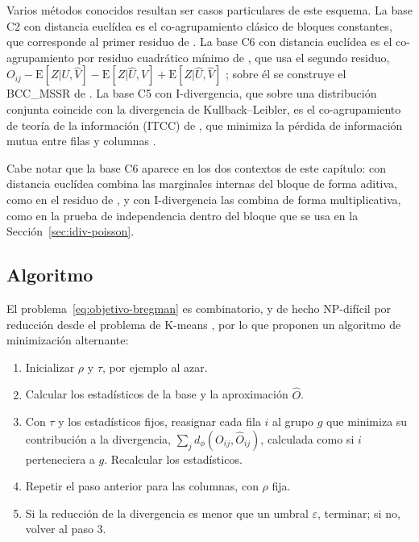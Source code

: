 Varios métodos conocidos resultan ser casos particulares de este esquema. La base
C2 con distancia euclídea es el co-agrupamiento clásico de bloques constantes, que
corresponde al primer residuo de \cite{Cho2004}. La base C6 con distancia euclídea
es el co-agrupamiento por residuo cuadrático mínimo de \cite{Cho2004}, que usa el
segundo residuo, $O_{ij} - \mathrm{E}[Z|U,\hat{V}] - \mathrm{E}[Z|\hat{U},V] +
\mathrm{E}[Z|\hat{U},\hat{V}]$ \cite[Ejemplo~2.F]{Banerjee2007}; sobre él se
construye el BCC\_MSSR de \cite{Wu2022}. La base C5 con I-divergencia, que sobre
una distribución conjunta coincide con la divergencia de Kullback--Leibler, es el
co-agrupamiento de teoría de la información (ITCC) de \cite{Dhillon2003}, que
minimiza la pérdida de información mutua entre filas y columnas
\cite[Ejemplo~1.F]{Banerjee2007}.

Cabe notar que la base C6 aparece en los dos contextos de este capítulo: con
distancia euclídea combina las marginales internas del bloque de forma aditiva,
como en el residuo de \cite{Cho2004}, y con I-divergencia las combina de forma
multiplicativa, como en la prueba de independencia dentro del bloque que se usa
en la Sección~\ref{sec:idiv-poisson}.

\subsection{Algoritmo}\label{sec:bbac-algoritmo}

El problema~\eqref{eq:objetivo-bregman} es combinatorio, y de hecho NP-difícil por
reducción desde el problema de K-means \cite{Banerjee2007}, por lo que
\cite{Banerjee2007} proponen un algoritmo de minimización alternante:

\begin{enumerate}
  \item Inicializar $\rho$ y $\tau$, por ejemplo al azar.
  \item Calcular los estadísticos de la base y la aproximación $\hat{O}$.
  \item Con $\tau$ y los estadísticos fijos, reasignar cada fila $i$ al grupo
        $g$ que minimiza su contribución a la divergencia,
        $\sum_j d_\phi(O_{ij}, \hat{O}_{ij})$, calculada como si $i$
        perteneciera a $g$. Recalcular los estadísticos.
  \item Repetir el paso anterior para las columnas, con $\rho$ fija.
  \item Si la reducción de la divergencia es menor que un umbral $\varepsilon$,
        terminar; si no, volver al paso 3.
\end{enumerate}


